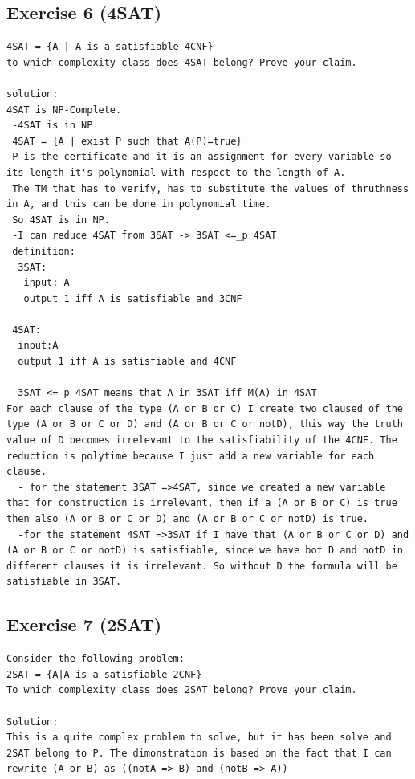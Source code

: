 \subsection{Exercise 6 (4SAT)}
\begin{lstlisting}[breaklines]
4SAT = {A | A is a satisfiable 4CNF}
to which complexity class does 4SAT belong? Prove your claim.

solution:
4SAT is NP-Complete.
 -4SAT is in NP
 4SAT = {A | exist P such that A(P)=true}
 P is the certificate and it is an assignment for every variable so its length it's polynomial with respect to the length of A. 
 The TM that has to verify, has to substitute the values of thruthness in A, and this can be done in polynomial time. 
 So 4SAT is in NP.
 -I can reduce 4SAT from 3SAT -> 3SAT <=_p 4SAT
 definition:
  3SAT:
   input: A
   output 1 iff A is satisfiable and 3CNF
 
 4SAT:
  input:A
  output 1 iff A is satisfiable and 4CNF
  
  3SAT <=_p 4SAT means that A in 3SAT iff M(A) in 4SAT  
For each clause of the type (A or B or C) I create two claused of the type (A or B or C or D) and (A or B or C or notD), this way the truth value of D becomes irrelevant to the satisfiability of the 4CNF. The reduction is polytime because I just add a new variable for each clause.
  - for the statement 3SAT =>4SAT, since we created a new variable that for construction is irrelevant, then if a (A or B or C) is true then also (A or B or C or D) and (A or B or C or notD) is true.
  -for the statement 4SAT =>3SAT if I have that (A or B or C or D) and (A or B or C or notD) is satisfiable, since we have bot D and notD in different clauses it is irrelevant. So without D the formula will be satisfiable in 3SAT.
\end{lstlisting}

\subsection{Exercise 7 (2SAT)}
\begin{lstlisting}[breaklines]
Consider the following problem:
2SAT = {A|A is a satisfiable 2CNF}
To which complexity class does 2SAT belong? Prove your claim.

Solution:
This is a quite complex problem to solve, but it has been solve and 2SAT belong to P. The dimonstration is based on the fact that I can rewrite (A or B) as ((notA => B) and (notB => A))
\end{lstlisting}

